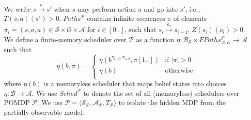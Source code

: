 %
We write $s \xrightarrow{a} s'$ when $s$ may perform action $a$ and go into $s'$, i.e., $T(s,a)(s') > 0$.
%
$Paths^\mathcal{P}$ contains infinite sequences $\pi$ of elements $\pi_i = (s,o,a) \in \mathcal{S} \times \mathcal{O} \times \mathcal{A}$ for $i \in [0..]$, such that $s_i \xrightarrow{a_i} s_{i+1}$, $Z(s_i)(o_i) > 0$.
%
We define a finite-memory scheduler over $\mathcal{P}$ as a function $\eta : \mathcal{B}_\mathcal{S} \times FPaths_{\mathcal{A},\mathcal{O}}^\mathcal{P} \rightarrow \mathcal{A}$ such that 
$$
\eta(b,\pi) = 
\begin{cases}
	\eta(b^{\pi_{i,\mathcal{A}},\pi_{i,\mathcal{O}}},\pi[1..]) & \text{if } |\pi| > 0 \\
	\eta(b) & \text{otherwise} \\
\end{cases}
$$ 
where $\eta(b)$ is a memoryless scheduler that maps belief states into choices $\eta:\mathcal{B}\rightarrow\mathcal{A}$. We use $Sched^\mathcal{P}$  to denote
the set of all (memoryless) 
schedulers over \ac{POMDP} $\mathcal{P}$. 
We use $\overline{\mathcal{P}} = \langle \mathcal{S}_\mathcal{P}, \mathcal{A}_\mathcal{P}, T_\mathcal{P} \rangle$ to isolate the hidden \ac{MDP} from the partially observable model.

